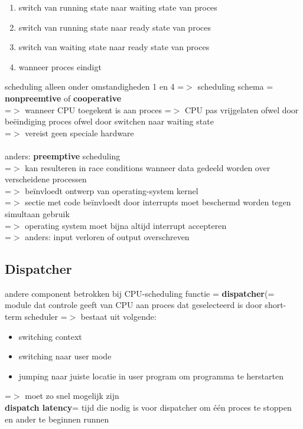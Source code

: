 \documentclass{report}
\begin{document}
\begin{enumerate}
\item switch van running state naar waiting state van proces
\item switch van running state naar ready state van proces
\item switch van waiting state naar ready state van proces
\item wanneer proces eindigt
\end{enumerate}

scheduling alleen onder omstandigheden 1 en 4 =$>$ scheduling schema = \textbf{nonpreemtive} of \textbf{cooperative}
\\=$>$ wanneer CPU toegekent is aan proces =$>$ CPU pas vrijgelaten ofwel door be\"eindiging proces ofwel door switchen naar waiting state
\\=$>$ vereist geen speciale hardware
\\
\\anders: \textbf{preemptive} scheduling
\\=$>$ kan resulteren in race conditions wanneer data gedeeld worden over verscheidene processen
\\=$>$ be\"invloedt ontwerp van operating-system kernel
\\=$>$ sectie met code be\"invloedt door interrupts moet beschermd worden tegen simultaan gebruik
\\=$>$ operating system moet bijna altijd interrupt accepteren
\\=$>$ anders: input verloren of output overschreven

\subsection{Dispatcher}
andere component betrokken bij CPU-scheduling functie = \textbf{dispatcher}(= module dat controle geeft van CPU aan proces dat geselecteerd is door short-term scheduler
=$>$ bestaat uit volgende:
\begin{itemize}
\item switching context
\item switching naar user mode
\item jumping naar juiste locatie in user program om programma te herstarten
\end{itemize}
=$>$ moet zo snel mogelijk zijn
\\\textbf{dispatch latency}= tijd die nodig is voor dispatcher om \'e\'en proces te stoppen en ander te beginnen runnen
\end{document}
